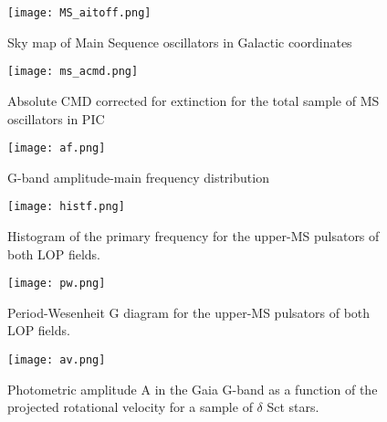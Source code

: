 \begin{figure}[H]
\centering
\texttt{[image: MS\_aitoff.png]}
\caption{Sky map of Main Sequence oscillators in Galactic coordinates }
\label{fig:All-sky map of Main Sequence oscillators}
\end{figure}


\begin{comment}
\begin{figure}[H]
\centering
\texttt{[image: ms\_cmd.png]}
\caption{Absolute CMD corrected for extinction for the MS oscillators in LOPN1}
\label{fig:Absolute CMD corrected for extinction for the MS oscillators in LOPN1}
\end{figure}


\begin{figure}[H]
\centering
\texttt{[image: ms2\_cmd.png]}
\caption{Absolute CMD corrected for extinction for the MS oscillators in LOPS2}
\label{fig:Absolute CMD corrected for extinction for the solar-like variables in LOPS2}
\end{figure}
\end{comment}

\begin{figure}[H]
\centering
\texttt{[image: ms\_acmd.png]}
\caption{Absolute CMD corrected for extinction for the total sample of MS oscillators in PIC}
\label{fig:ms_cmd}
\end{figure}


\begin{figure}[H]
\centering
\texttt{[image: af.png]}
\caption{G-band amplitude-main frequency distribution}
\label{fig:af}
\end{figure}

\begin{figure}[H]
\centering
\texttt{[image: histf.png]}
\caption{Histogram of the primary frequency for the upper-MS pulsators of both LOP fields.}
\label{fig:histf}
\end{figure}


\begin{figure}[H]
\centering
\texttt{[image: pw.png]}
\caption{Period-Wesenheit G diagram for the upper-MS pulsators of both LOP fields.}
\label{fig:pw}
\end{figure}

\begin{figure}[H]
\centering
\texttt{[image: av.png]}
\caption{Photometric amplitude A in the Gaia G-band as a function
of the projected rotational velocity for a sample of $\delta$ Sct stars.}
\label{fig:av}
\end{figure}



